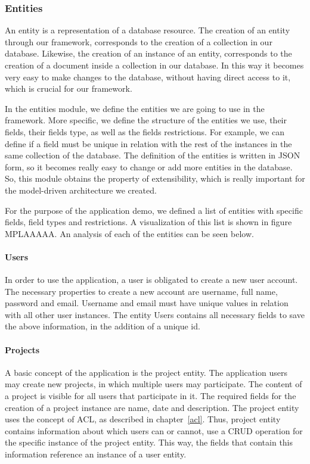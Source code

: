 \subsubsection{Entities}
\label{entities}
An entity is a representation of a database resource. The creation of an entity through our framework, corresponds to the creation of a collection in our database. Likewise, the creation of an instance of an entity, corresponds to the creation of a document inside a collection in our database. In this way it becomes very easy to make changes to the database, without having direct access to it, which is crucial for our framework.\par
	In the entities module, we define the entities we are going to use in the framework. More specific, we define the structure of the entities we use, their fields, their fields type, as well as the fields restrictions. For example, we can define if a field must be unique in relation with the rest of the instances in the same collection of the database. The definition of the entities is written in JSON form, so it becomes really easy to change or add more entities in the database. So, this module obtains the property of extensibility, which is really important for the model-driven architecture we created. \par 
	For the purpose of the application demo, we defined a list of entities with specific fields, field types and restrictions. A visualization of this list is shown in figure MPLAAAAA. An analysis of each of the entities can be seen below.\par
	
	 
\paragraph{Users}
In order to use the application, a user is obligated to create a new user account. The necessary properties to create a new account are username, full name, password and email. Username and email must have unique values in relation with all other user instances. The entity Users contains all necessary fields to save the above information, in the addition of a unique id.
\paragraph{Projects}
A basic concept of the application is the project entity. The application users may create new projects, in which multiple users may participate. The content of a project is visible for all users that participate in it. The required fields for the creation of a project instance are name, date and description. The project entity uses the concept of ACL, as described in chapter~\ref{acl}. Thus, project entity contains information about which users can or cannot, use a CRUD operation for the specific instance of the project entity. This way, the fields that contain this information reference an instance of a user entity.
